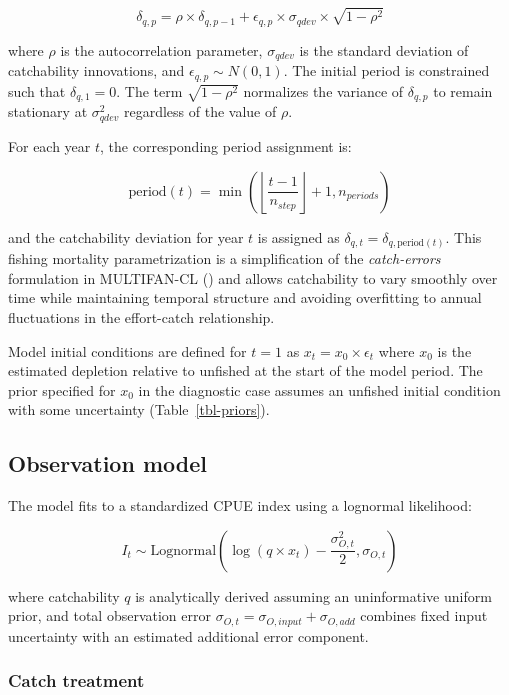 \documentclass[
  11pt,
]{SCreport}
\begin{document}
\[\delta_{q,p} = \rho \times \delta_{q,p-1} + \epsilon_{q,p} \times \sigma_{qdev} \times \sqrt{1 - \rho^2}\]

where \(\rho\) is the autocorrelation parameter, \(\sigma_{qdev}\) is
the standard deviation of catchability innovations, and
\(\epsilon_{q,p} \sim N(0,1)\). The initial period is constrained such
that \(\delta_{q,1} = 0\). The term \(\sqrt{1 - \rho^2}\) normalizes the
variance of \(\delta_{q,p}\) to remain stationary at \(\sigma^2_{qdev}\)
regardless of the value of \(\rho\).

For each year \(t\), the corresponding period assignment is:

\[\text{period}(t) = \min\left(\left\lfloor\frac{t-1}{n_{step}}\right\rfloor + 1, n_{periods}\right)\]

and the catchability deviation for year \(t\) is assigned as
\(\delta_{q,t} = \delta_{q,\text{period}(t)}\). This fishing mortality
parametrization is a simplification of the \emph{catch-errors}
formulation in MULTIFAN-CL
() and
allows catchability to vary smoothly over time while maintaining
temporal structure and avoiding overfitting to annual fluctuations in
the effort-catch relationship.

Model initial conditions are defined for \(t = 1\) as
\(x_t = x_0 \times \epsilon_t\) where \(x_0\) is the estimated depletion
relative to unfished at the start of the model period. The prior
specified for \(x_0\) in the diagnostic case assumes an unfished initial
condition with some uncertainty (Table~\ref{tbl-priors}).

\subsection{Observation model}\label{sec-observation-model}

The model fits to a standardized CPUE index using a lognormal
likelihood:

\[I_t \sim \text{Lognormal}(\log(q \times x_t) - \frac{\sigma_{O,t}^2}{2}, \sigma_{O,t})\]

where catchability \(q\) is analytically derived assuming an
uninformative uniform prior, and total observation error
\(\sigma_{O,t} = \sigma_{O,input} + \sigma_{O,add}\) combines fixed
input uncertainty with an estimated additional error component.

\subsubsection{Catch treatment}\label{sec-catch-treatment}
\end{document}
